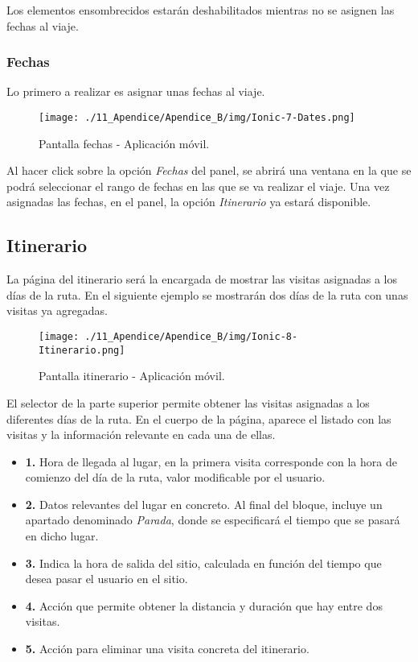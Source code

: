 Los elementos ensombrecidos estarán deshabilitados mientras no se asignen las fechas al viaje.


\subsubsection*{Fechas}

Lo primero a realizar es asignar unas fechas al viaje.

\begin{figure}[H]
\centering
\texttt{[image: ./11\_Apendice/Apendice\_B/img/Ionic-7-Dates.png]}
\caption{Pantalla fechas - Aplicación móvil.}
\end{figure}

Al hacer click sobre la opción \textit{Fechas} del panel, se abrirá una ventana en la que se podrá seleccionar el rango de fechas en las que se va realizar el viaje. Una vez asignadas las fechas, en el panel, la opción \textit{Itinerario} ya estará disponible.


\subsection*{Itinerario}
La página del itinerario será la encargada de mostrar las visitas asignadas a los días de la ruta. En el siguiente ejemplo se mostrarán dos días de la ruta con unas visitas ya agregadas.

\begin{figure}[H]
\centering
\texttt{[image: ./11\_Apendice/Apendice\_B/img/Ionic-8-Itinerario.png]}
\caption{Pantalla itinerario - Aplicación móvil.}
\end{figure}

El selector de la parte superior permite obtener las visitas asignadas a los diferentes días de la ruta. En el cuerpo de la página, aparece el listado con las visitas y la información  relevante en cada una de ellas.

\begin{itemize}
	\item \textbf{1. }Hora de llegada al lugar, en la primera visita corresponde con la hora de comienzo del día de la ruta, valor modificable por el usuario. 	
	
	\item \textbf{2. }Datos relevantes del lugar en concreto. Al final del bloque, incluye un apartado denominado \textit{Parada}, donde se especificará el tiempo que se pasará en dicho lugar. 
	
	\item \textbf{3. }Indica la hora de salida del sitio, calculada en función del tiempo que desea pasar el usuario en el sitio.
	
	\item \textbf{4. }Acción que permite obtener la distancia y duración que hay entre dos visitas.
	
	\item \textbf{5. }Acción para eliminar una visita concreta del itinerario.
\end{itemize}

